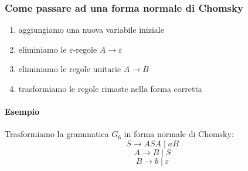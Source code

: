 \subsubsection{Come passare ad una forma normale di Chomsky}
\begin{enumerate}
	\item aggiungiamo una nuova variabile iniziale
	\item eliminiamo le $\varepsilon$-regole $A \rightarrow\varepsilon$ 
	\item eliminiamo le regole unitarie $A\rightarrow B$ 
	\item trasformiamo le regole rimaste nella forma corretta
\end{enumerate}

\paragraph{Esempio}
Trasformiamo la grammatica $G_6$ in forma normale di Chomsky:
$$S\rightarrow ASA\mid aB$$
$$A\rightarrow B\mid S$$ $$B\rightarrow b\mid \varepsilon$$
